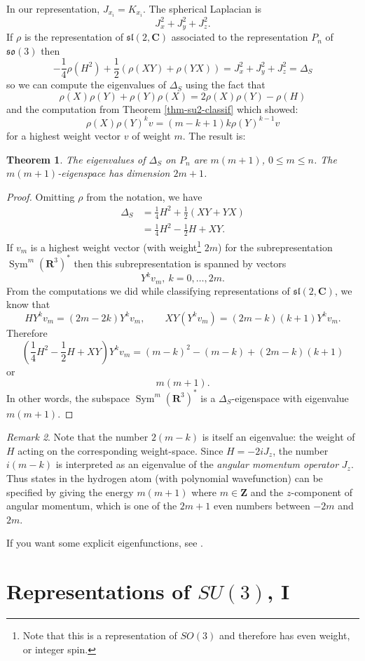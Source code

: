 \documentclass[12pt]{article}
\newcommand{\CC}{\mathbf{C}}
\newcommand{\RR}{\mathbf{R}}
\newcommand{\ZZ}{\mathbf{Z}}
\newcommand{\OP}{\operatorname}
\newcommand{\Sym}{\OP{Sym}}
\newtheorem{thm}{Theorem}[section]
\theoremstyle{definition}
\theoremstyle{check}
\theoremstyle{remark}
\newtheorem{rmk}[thm]{Remark}
\theoremstyle{TheoremNum}
\begin{document}
In our representation, $J_{x_i}=K_{x_i}$. The spherical Laplacian is
\[J_x^2+J_y^2+J_z^2.\]
If $\rho$ is the representation of $\mathfrak{sl}(2,\CC)$ associated to the representation $P_n$ of $\mathfrak{so}(3)$ then
\[-\frac{1}{4}\rho(H^2)+\frac{1}{2}\left(\rho(XY)+\rho(YX)\right)=J_x^2+J_y^2+J_z^2=\Delta_S\]
so we can compute the eigenvalues of $\Delta_S$ using the fact that
\[\rho(X)\rho(Y)+\rho(Y)\rho(X)=2\rho(X)\rho(Y)-\rho(H)\]
and the computation from Theorem \ref{thm-su2-classif} which showed:
\[\rho(X)\rho(Y)^kv=(m-k+1)k\rho(Y)^{k-1}v\]
for a highest weight vector $v$ of weight $m$. The result is:
\begin{thm}
The eigenvalues of $\Delta_S$ on $P_n$ are $m(m+1)$, $0\leq m\leq n$. The $m(m+1)$-eigenspace has dimension $2m+1$.
\end{thm}
\begin{proof}
Omitting $\rho$ from the notation, we have
\begin{align*}
\Delta_S&=\frac{1}{4}H^2+\frac{1}{2}(XY+YX)\\
&=\frac{1}{4}H^2-\frac{1}{2}H+XY.
\end{align*}
If $v_m$ is a highest weight vector (with weight\footnote{Note that this is a representation of $SO(3)$ and therefore has even weight, or integer spin.} $2m$) for the subrepresentation $\Sym^m(\RR^3)^*$ then this subrepresentation is spanned by vectors
\[Y^kv_m,\ k=0,\ldots,2m.\]
From the computations we did while classifying representations of $\mathfrak{sl}(2,\CC)$, we know that
\[HY^kv_m=(2m-2k)Y^kv_m,\qquad XY(Y^kv_m)=(2m-k)(k+1)Y^kv_m.\]
Therefore
\[\left(\frac{1}{4}H^2-\frac{1}{2}H+XY\right)Y^kv_m=(m-k)^2-(m-k)+(2m-k)(k+1)\]
or
\[m(m+1).\]
In other words, the subspace $\Sym^m(\RR^3)^*$ is a $\Delta_S$-eigenspace with eigenvalue $m(m+1)$.
\end{proof}
\begin{rmk}
Note that the number $2(m-k)$ is itself an eigenvalue: the weight of $H$ acting on the corresponding weight-space. Since $H=-2iJ_z$, the number $i(m-k)$ is interpreted as an eigenvalue of the {\em angular momentum operator} $J_z$. Thus states in the hydrogen atom (with polynomial wavefunction) can be specified by giving the energy $m(m+1)$ where $m\in\ZZ$ and the $z$-component of angular momentum, which is one of the $2m+1$ even numbers between $-2m$ and $2m$.
\end{rmk}

If you want some explicit eigenfunctions, see {\cite[Section 4.9]{Kir}}.

\section{Representations of \texorpdfstring{$SU(3)$}{SU(3)}, I}
\end{document}
